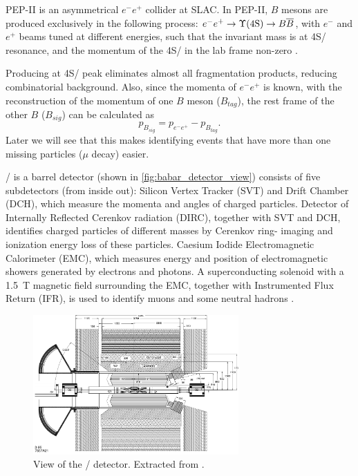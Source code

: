 PEP-II is an asymmetrical $e^- e^+$ collider at SLAC.
In PEP-II, $B$ mesons are produced exclusively in the following process:
$e^- e^+ \rightarrow \Y4S/ \rightarrow B \overline{B}$, with 
$e^-$ and $e^+$ beams tuned at different energies,
such that the invariant mass is at \Y4S/ resonance,
and the momentum of the \Y4S/ in the lab frame
non-zero \cite{Harrison:1998yr}.

Producing at \Y4S/ peak eliminates almost all fragmentation products, reducing combinatorial
background.
Also, since the momenta of $e^- e^+$ is known, with the reconstruction of the
momentum of one $B$ meson ($B_{tag}$), the rest frame of the other $B$ ($B_{sig}$) can 
be calculated as
\begin{equation}
    p_{B_{sig}} = p_{e^-e^+} - p_{B_{tag}}.
\end{equation}
Later we will see that this makes identifying events that have more than one missing particles
($\mu$ decay) easier.

\BaBar/ is a barrel detector (shown in \autoref{fig:babar_detector_view})
consists of five subdetectors (from inside out):
Silicon Vertex Tracker (SVT) and Drift Chamber (DCH), which measure the momenta
and angles of charged particles.
Detector of Internally Reflected Cerenkov radiation (DIRC), together with SVT
and DCH, identifies charged particles of different masses by Cerenkov ring-
imaging and ionization energy loss of these particles.
Caesium Iodide Electromagnetic Calorimeter (EMC), which measures energy and
position of electromagnetic showers generated by electrons and photons.
A superconducting solenoid with a \SI{1.5}{T} magnetic field surrounding the
EMC, together with Instrumented Flux Return (IFR), is used to identify muons and
some neutral hadrons \cite{Lees:2013uzd}.

\begin{figure}[ht]
    \centering
    \includegraphics[width=0.7\textwidth]{figs/babar_detector_view.pdf}
    \caption{
        View of the \BaBar/ detector.
        Extracted from \cite{Boutigny:1995ib}.
    }
    \label{fig:babar_detector_view}
\end{figure}

